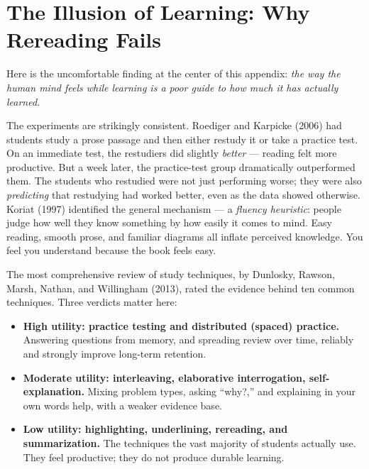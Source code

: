 \section{The Illusion of Learning: Why Rereading Fails}
\label{sec:learningmap:illusion}

Here is the uncomfortable finding at the center of this appendix: \emph{the way the human mind feels while learning is a poor guide to how much it has actually learned.}  

The experiments are strikingly consistent. Roediger and Karpicke (2006) had students study a prose passage and then either restudy it or take a practice test. On an immediate test, the restudiers did slightly \emph{better} --- reading felt more productive. But a week later, the practice-test group dramatically outperformed them. The students who restudied were not just performing worse; they were also \emph{predicting} that restudying had worked better, even as the data showed otherwise. Koriat (1997) identified the general mechanism --- a \emph{fluency heuristic}: people judge how well they know something by how easily it comes to mind. Easy reading, smooth prose, and familiar diagrams all inflate perceived knowledge. You feel you understand because the book feels easy.  

The most comprehensive review of study techniques, by Dunlosky, Rawson, Marsh, Nathan, and Willingham (2013), rated the evidence behind ten common techniques. Three verdicts matter here:
\begin{itemize}
\item \textbf{High utility: practice testing and distributed (spaced) practice.} Answering questions from memory, and spreading review over time, reliably and strongly improve long-term retention.
\item \textbf{Moderate utility: interleaving, elaborative interrogation, self-explanation.} Mixing problem types, asking ``why?,'' and explaining in your own words help, with a weaker evidence base.
\item \textbf{Low utility: highlighting, underlining, rereading, and summarization.} The techniques the vast majority of students actually use. They feel productive; they do not produce durable learning. 
\end{itemize}

